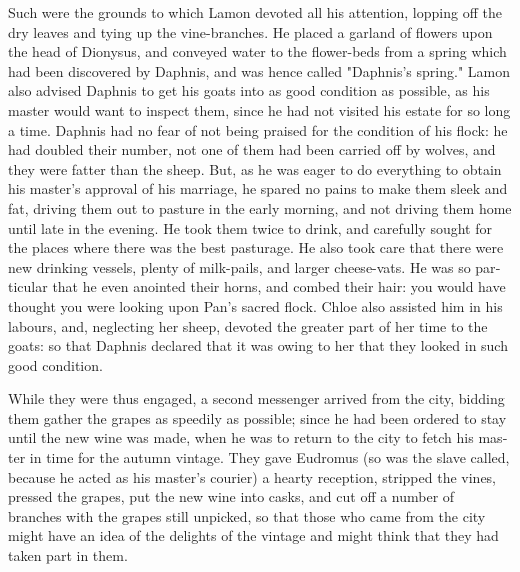 \documentclass{book}
\begin{document}
\begin{pairs}
\begin{Rightside}
\begin{english}
  Such were the grounds to which Lamon devoted all his attention, lopping off the dry leaves and tying up the vine-branches.  He placed a garland of flowers upon the head of Dionysus, and conveyed water to the flower-beds from a spring which had been discovered by Daphnis, and was hence called "Daphnis's spring."  Lamon also advised Daphnis to get his goats into as good condition as possible, as his master would want to inspect them, since he had not visited his estate for so long a time. Daphnis had no fear of not being praised for the condition of his flock: he had doubled their number, not one of them had been carried off by wolves, and they were fatter than the sheep.  But, as he was eager to do everything to obtain his master's approval of his marriage, he spared no pains to make them sleek and fat, driving them out to pasture in the early morning, and not driving them home until late in the evening.  He took them twice to drink, and carefully sought for the places where there was the best pasturage.  He also took care that there were new drinking vessels, plenty of milk-pails, and larger cheese-vats.  He was so particular that he even anointed their horns, and combed their hair: you would have thought you were looking upon Pan's sacred flock.  Chloe also assisted him in his labours, and, neglecting her sheep, devoted the greater part of her time to the goats: so that Daphnis declared that it was owing to her that they looked in such good condition.
\pend


  While they were thus engaged, a second messenger arrived from the city, bidding them gather the grapes as speedily as possible; since he had been ordered to stay until the new wine was made, when he was to return to the city to fetch his master in time for the autumn vintage.  They gave Eudromus (so was the slave called, because he acted as his master's courier) a hearty reception, stripped the vines, pressed the grapes, put the new wine into casks, and cut off a number of branches with the grapes still unpicked, so that those who came from the city might have an idea of the delights of the vintage and might think that they had taken part in them.
\pend



\end{english}
\end{Rightside}
\end{pairs}
\end{document}
